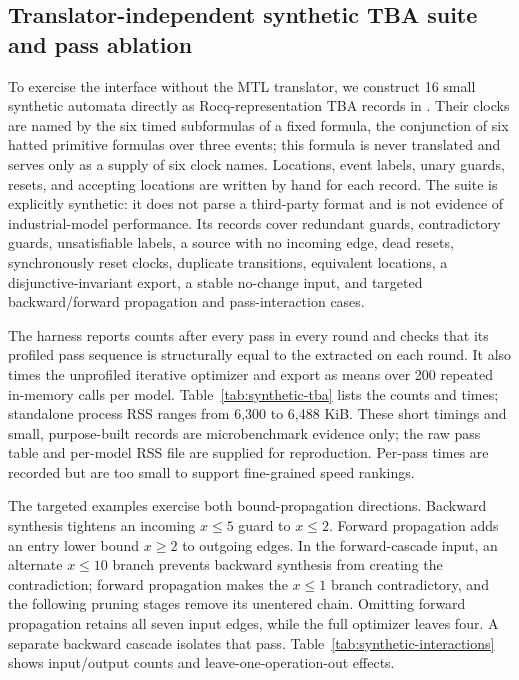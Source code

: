 \subsection{Translator-independent synthetic TBA suite and pass ablation}\label{sec:synthetic-detail}
To exercise the interface without the MTL translator, we construct
16 small synthetic automata directly as Rocq-representation TBA records in
. Their clocks are named by the six
timed subformulas of a fixed formula, the conjunction of six hatted primitive
formulas over three events; this formula is never translated and serves only
as a supply of six clock names. Locations, event labels, unary guards,
resets, and accepting locations are written by hand for each record. The suite is explicitly
synthetic: it does not parse a third-party format and is not evidence of
industrial-model performance. Its records cover redundant guards,
contradictory guards, unsatisfiable labels, a source with no incoming edge,
dead resets, synchronously reset clocks, duplicate transitions, equivalent
locations, a disjunctive-invariant export, a stable no-change input, and
targeted backward/forward propagation and pass-interaction cases.


The harness reports counts after every pass in every round and checks that
its profiled pass sequence is structurally equal to the extracted
 on each round. It also times the unprofiled iterative
optimizer and export as means over 200 repeated in-memory calls per model.
Table~\ref{tab:synthetic-tba} lists the counts and times; standalone process RSS ranges from 6,300 to 6,488 KiB. These short timings
and small, purpose-built records are microbenchmark evidence only; the raw
pass table and per-model RSS file are supplied for reproduction. Per-pass
times are recorded but are too small to support fine-grained speed rankings.

The targeted examples exercise both bound-propagation directions. Backward
synthesis tightens an incoming $x\leq5$ guard to $x\leq2$. Forward
propagation adds an entry lower bound $x\geq2$ to outgoing edges. In the
forward-cascade input, an alternate $x\leq10$ branch prevents backward
synthesis from creating the contradiction; forward propagation makes the
$x\leq1$ branch contradictory, and the following pruning stages remove its
unentered chain. Omitting forward propagation retains all seven input edges,
while the full optimizer leaves four. A separate backward cascade isolates
that pass. Table~\ref{tab:synthetic-interactions} shows input/output counts
and leave-one-operation-out effects.

